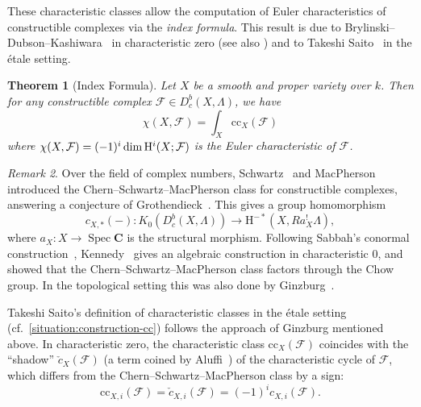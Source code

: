 \documentclass[english]{smfart}
\let\sum\relax\DeclareMathSymbol{\sum}{\mathop}{fourier}{80}
\renewcommand{\mathbb}{\mathbf}
\theoremstyle{remark}
\newtheorem{remark}{Remark}[subsection]
\theoremstyle{plain}
\newtheorem{theorem}[remark]{Theorem}
\theoremstyle{definition}
\numberwithin{equation}{remark}
\theoremstyle{void}
\begin{document}
These characteristic classes allow the computation of Euler
characteristics of constructible complexes via the \emph{index formula}.
This result is due to
Brylinski--Dubson--Kashiwara~\cite{brylinski-dubson-kashiwara} in
characteristic zero (see also
\cite[(9.1.14)]{kashiwara-schapira_sheaves-on-manifolds}) and to
Takeshi Saito~\cite[Lemma~6.9(1),
Theorem~7.13]{saito_takeshi_characteristic-cycle-and-singular-support}
in the étale setting.

\begin{theorem}[Index Formula]\label{theorem:index}
Let \(X\) be a smooth and proper variety over \(k\).  Then for any
constructible complex \(\mathcal{F} \in D^b_c(X,\Lambda)\), we have
\[
\chi(X,\mathcal{F}) = \int_X \mathrm{cc}_{X}(\mathcal{F})
\]
where
\(\chi(X,\mathcal{F}) = \sum (-1)^i \dim \mathrm{H}^i(X;\mathcal{F})\)
is the Euler characteristic of \(\mathcal{F}\).
\end{theorem}


\begin{remark}
Over the field of complex numbers,
Schwartz~\cite{schwartz_characteristic-classes-1,schwartz_characteristic-classes-2}
and MacPherson~\cite{macpherson_chern-classes-for-singular-varieties}
introduced the Chern--Schwartz--MacPherson class for constructible
complexes, answering a conjecture of
Grothendieck~\cite[Note~87\textsubscript{1}]{grothendieck_recoltes-et-semailles}.
This gives a group homomorphism
\[
c_{X,\ast}(-) \colon K_0(D^b_c(X,\Lambda)) \to \mathrm{H}^{-\ast}(X,Ra_X^{!}\Lambda),
\]
where \(a_X \colon X \to \operatorname{Spec}\mathbb{C}\) is the
structural morphism.  Following Sabbah's conormal
construction~\cite{sabbah_remarks-conormal-spaces},
Kennedy~\cite{kennedy_macpherson-classes} gives an algebraic
construction in characteristic \(0\), and showed that the
Chern--Schwartz--MacPherson class factors through the Chow group.  In
the topological setting this was also done by
Ginzburg~\cite[Appendix]{ginsburg_characteristic-varieties-and-vanishing-cycles}.

Takeshi Saito's definition of characteristic classes in the étale
setting~\cite{saito_takeshi_characteristic-cycle-and-singular-support}
(cf.~\ref{situation:construction-cc}) follows the approach of
Ginzburg mentioned above.  In characteristic zero, the characteristic class
\(\mathrm{cc}_{X}(\mathcal{F})\) coincides with the ``shadow''
\(\check{c}_{X}(\mathcal{F})\) (a term coined by
Aluffi~\cite{aluffi_shadow}) of the characteristic cycle of
\(\mathcal{F}\), which differs from the Chern--Schwartz--MacPherson
class by a sign:
\[
\mathrm{cc}_{X,i}(\mathcal{F}) = \check{c}_{X,i}(\mathcal{F}) = (-1)^{i} c_{X,i}(\mathcal{F}).
\]
\end{remark}
\end{document}
